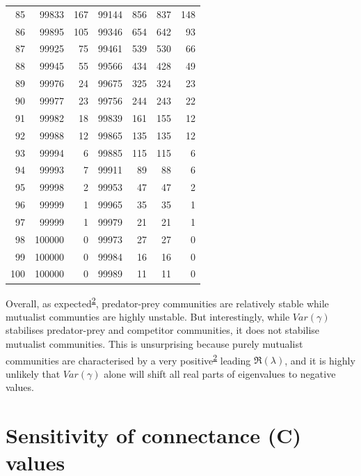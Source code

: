 \documentclass[]{article}
\begin{document}
\begin{longtable}[]{@{}rrrrrrr@{}}
85 & 99833 & 167 & 99144 & 856 & 837 & 148\tabularnewline
86 & 99895 & 105 & 99346 & 654 & 642 & 93\tabularnewline
87 & 99925 & 75 & 99461 & 539 & 530 & 66\tabularnewline
88 & 99945 & 55 & 99566 & 434 & 428 & 49\tabularnewline
89 & 99976 & 24 & 99675 & 325 & 324 & 23\tabularnewline
90 & 99977 & 23 & 99756 & 244 & 243 & 22\tabularnewline
91 & 99982 & 18 & 99839 & 161 & 155 & 12\tabularnewline
92 & 99988 & 12 & 99865 & 135 & 135 & 12\tabularnewline
93 & 99994 & 6 & 99885 & 115 & 115 & 6\tabularnewline
94 & 99993 & 7 & 99911 & 89 & 88 & 6\tabularnewline
95 & 99998 & 2 & 99953 & 47 & 47 & 2\tabularnewline
96 & 99999 & 1 & 99965 & 35 & 35 & 1\tabularnewline
97 & 99999 & 1 & 99979 & 21 & 21 & 1\tabularnewline
98 & 100000 & 0 & 99973 & 27 & 27 & 0\tabularnewline
99 & 100000 & 0 & 99984 & 16 & 16 & 0\tabularnewline
100 & 100000 & 0 & 99989 & 11 & 11 & 0\tabularnewline
\bottomrule
\end{longtable}

Overall, as
expected\textsuperscript{\protect\hyperlink{ref-Allesina2012}{2}},
predator-prey communities are relatively stable while mutualist
communties are highly unstable. But interestingly, while \(Var(\gamma)\)
stabilises predator-prey and competitor communities, it does not
stabilise mutualist communities. This is unsurprising because purely
mutualist communities are characterised by a very
positive\textsuperscript{\protect\hyperlink{ref-Allesina2012}{2}}
leading \(\Re(\lambda)\), and it is highly unlikely that \(Var(\gamma)\)
alone will shift all real parts of eigenvalues to negative values.

\hypertarget{connectance}{\section{Sensitivity of connectance (C)
values}\label{connectance}}
\end{document}
